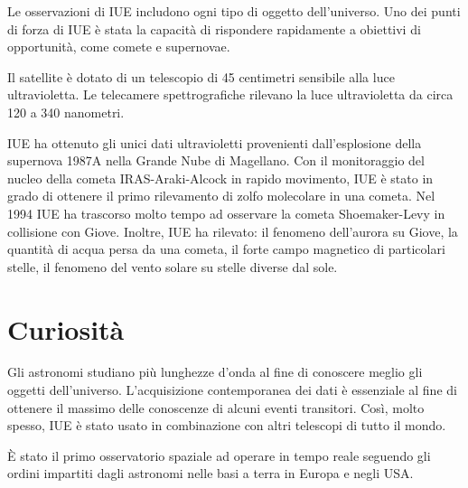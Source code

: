 \documentclass[12pt,a4paper]{article}
\begin{document}
Le osservazioni di IUE includono ogni tipo di oggetto dell'universo. Uno dei punti di forza di IUE è stata la capacità di rispondere rapidamente a obiettivi di opportunità, come comete e supernovae.

Il satellite è dotato di un telescopio di 45 centimetri sensibile alla luce ultravioletta. Le telecamere spettrografiche rilevano la luce ultravioletta da circa 120 a 340 nanometri.

IUE ha ottenuto gli unici dati ultravioletti provenienti dall'esplosione della supernova 1987A nella Grande Nube di Magellano.
Con il monitoraggio del nucleo della cometa IRAS-Araki-Alcock in rapido movimento, IUE è stato in grado di ottenere il primo rilevamento di zolfo molecolare in una cometa.
Nel 1994 IUE ha trascorso molto tempo ad osservare la cometa Shoemaker-Levy in collisione con Giove.
Inoltre, IUE ha rilevato: il fenomeno dell'aurora su Giove, la quantità di acqua persa da una cometa, il forte campo magnetico di particolari stelle, il fenomeno del vento solare su stelle diverse dal sole.

\section*{Curiosità}
\label{curiosit}

Gli astronomi studiano più lunghezze d'onda al fine di conoscere meglio gli oggetti dell'universo. L'acquisizione contemporanea dei dati è essenziale al fine di ottenere il massimo delle conoscenze di alcuni eventi transitori. Così, molto spesso, IUE è stato usato in combinazione con altri telescopi di tutto il mondo.

È stato il primo osservatorio spaziale ad operare in tempo reale seguendo gli ordini impartiti dagli astronomi nelle basi a terra in Europa e negli USA.
\end{document}

